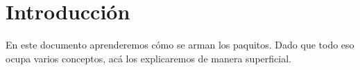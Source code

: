 \section*{Introducción}
En este documento aprenderemos cómo se arman los paquitos. Dado que todo eso ocupa varios conceptos, acá los explicaremos de manera superficial. 